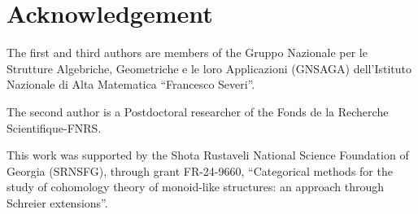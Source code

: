 \documentclass[11pt]{amsart}
\theoremstyle{plain}
\theoremstyle{definition}
\theoremstyle{remark}
\begin{document}
\section*{Acknowledgement}
The first and third authors are members of the Gruppo Nazionale per le Strutture Algebriche, Geometriche e le loro Applicazioni (GNSAGA) dell'Istituto Nazionale di Alta Matematica ``Francesco Severi''.

The second author is a Postdoctoral researcher of the Fonds de la Recherche Scientifique-FNRS.

This work was supported by the Shota Rustaveli National Science Foundation of Georgia (SRNSFG), through grant FR-24-9660, ``Categorical methods for the study of cohomology theory of monoid-like structures: an approach through Schreier extensions''.
\end{document}

